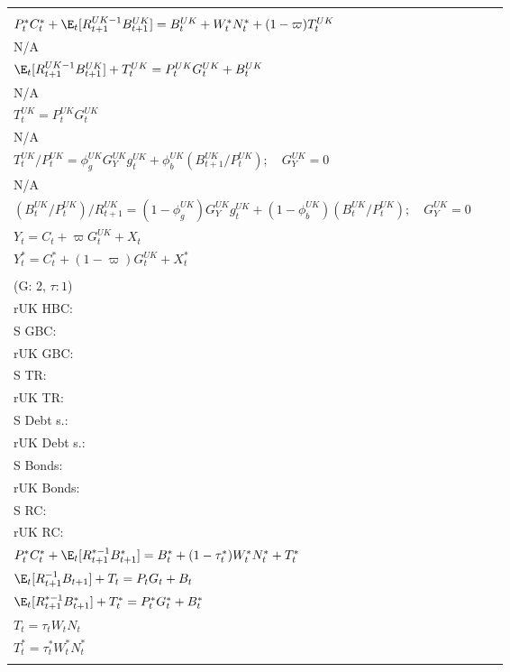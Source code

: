 \begin{table}[H]
\begin{tabular}{l|l c}
        \makecell{
            $P_t C_t + \E_t [{R^{UK-1}_{t+1}}B^{UK}_{t+1}] = B^{UK}_t + W_t N_t + \varpi T^{UK}_t$ \\
            $P^*_t C^*_t + \E_t [{R^{UK-1}_{t+1}}B^{UK}_{t+1}] = B^{UK}_t + W^*_t N^*_t + (1-\varpi)T^{UK}_t$ \\
            N/A\\
            $\E_t [{R^{UK-1}_{t+1}}B^{UK}_{t+1}] + T^{UK}_t = P^{UK}_tG^{UK}_t + B^{UK}_t$\\
            N/A \\
            $T^{UK}_t = P^{UK}_tG^{UK}_t$ \\
            N/A\\
            $T^{UK}_t / P^{UK}_t = \phi^{UK}_g G^{UK}_Y g^{UK}_t + \phi^{UK}_b(B^{UK}_{t+1} / P^{UK}_t); \quad G^{UK}_Y = 0$\\
            N/A\\
            $(B^{UK}_t / P^{UK}_t) / R^{UK}_{t+1} = (1-\phi^{UK}_g) G^{UK}_Y g^{UK}_t + (1-\phi^{UK}_b)(B^{UK}_t / P^{UK}_t); \quad G^{UK}_Y = 0$\\
            $Y_t = C_t + \varpi G^{UK}_t + X_t$ \\
            $Y^*_t = C^*_t + (1-\varpi) G^{UK}_t + X^*_t$
        }   \\ 
    \makecell{Scenario 3 \\ (G: 2, $\tau: 1$)} &  \makecell{S HBC: \\ rUK HBC: \\ S GBC: \\ rUK GBC: \\ S TR: \\ rUK TR: \\ S Debt s.:\\ rUK Debt s.:\\ S Bonds: \\ rUK Bonds: \\ S RC: \\ rUK RC:} & 
    \makecell{
        $P_t C_t + \E_t [{R^{-1}_{t+1}}B_{t+1}] = B_t + (1-\tau_t)W_t N_t + T_t$ \\
        $P^*_t C^*_t + \E_t [{R^{*-1}_{t+1}}B^*_{t+1}] = B^*_t + (1-\tau^*_t)W^*_t N^*_t + T^*_t$ \\
        $\E_t [{R^{-1}_{t+1}}B_{t+1}] + T_t = P_tG_t + B_t$\\ 
        $\E_t [{R^{*-1}_{t+1}}B^*_{t+1}] + T^*_t = P^*_tG^*_t + B^*_t$\\ 
        $T_t = \tau_t W_t N_t$ \\
        $T^*_t = \tau^*_t W^*_t N^*_t$ \\
}
\end{tabular}
\end{table}
